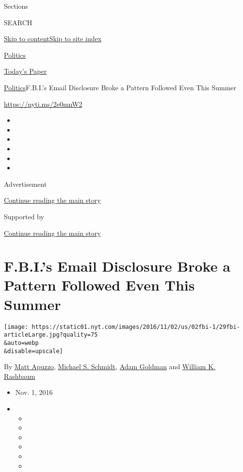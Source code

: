 Sections

SEARCH

\protect\hyperlink{site-content}{Skip to
content}\protect\hyperlink{site-index}{Skip to site index}

\href{https://www.nytimes.com/section/politics}{Politics}

\href{https://myaccount.nytimes.com/auth/login?response_type=cookie\&client_id=vi}{}

\href{https://www.nytimes.com/section/todayspaper}{Today's Paper}

\href{/section/politics}{Politics}\textbar{}F.B.I.'s Email Disclosure
Broke a Pattern Followed Even This Summer

\url{https://nyti.ms/2e0mnW2}

\begin{itemize}
\item
\item
\item
\item
\item
\item
\end{itemize}

Advertisement

\protect\hyperlink{after-top}{Continue reading the main story}

Supported by

\protect\hyperlink{after-sponsor}{Continue reading the main story}

\hypertarget{fbis-email-disclosure-broke-a-pattern-followed-even-this-summer}{%
\section{F.B.I.'s Email Disclosure Broke a Pattern Followed Even This
Summer}\label{fbis-email-disclosure-broke-a-pattern-followed-even-this-summer}}

\texttt{[image: https://static01.nyt.com/images/2016/11/02/us/02fbi-1/29fbi-articleLarge.jpg?quality=75\\\&auto=webp\\\&disable=upscale]}

By \href{http://www.nytimes.com/by/matt-apuzzo}{Matt Apuzzo},
\href{http://www.nytimes.com/by/michael-s-schmidt}{Michael S. Schmidt},
\href{https://www.nytimes.com/by/adam-goldman}{Adam Goldman} and
\href{http://www.nytimes.com/by/william-k-rashbaum}{William K. Rashbaum}

\begin{itemize}
\item
  Nov. 1, 2016
\item
  \begin{itemize}
  \item
  \item
  \item
  \item
  \item
  \item
  \end{itemize}
\end{itemize}


